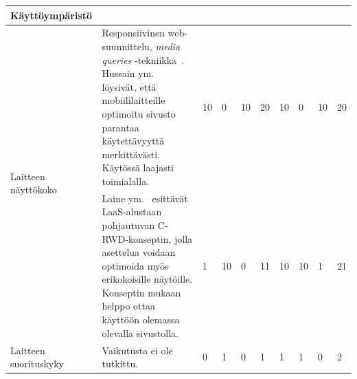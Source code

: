 \documentclass[finnish, 12pt, a4paper, elec, utf8, a-1b, online]{aaltothesis}
\begin{document}
{\begin{longtable}{p{2.5cm}|p{6cm}|p{0.5cm}p{0.5cm}p{0.5cm}|p{0.5cm}|p{0.5cm}p{0.5cm}p{0.5cm}|p{0.5cm}|}
    \midrule
    \textbf{Käyttöympäristö}                                                                                                                                                                                                                                                                                                                                                                                                                                                                                                                                                                                                                                                                                                                              \\
    \midrule
    \multirow[t]{2}{*}{Laitteen näyttökoko} & Responsiivinen web-suunnittelu, \textit{media queries} -tekniikka~\cite{Rivoal:12:MQ}. Hussain ym.~\cite{WOS:000218608600006} löysivät, että mobiililaitteille optimoitu sivusto parantaa käytettävyyttä merkittävästi. Käytössä laajasti toimialalla.                                                                                                                  & 10                                         & 0                                   & 10                                     & 20                           & 10                                              & 0                                         & 10                                        & 20                           \\\cline{2-10}
                                            & Laine ym.~\cite{laine2021responsive} esittävät LaaS-alustaan pohjautuvan C-RWD-konseptin, jolla asettelua voidaan optimoida myös erikokoisille näytöille. Konseptin mukaan helppo ottaa käyttöön olemassa olevalla sivustolla.                                                                                                                                          & 1                                          & 10                                  & 0                                      & 11                           & 10                                              & 10                                        & 1                                         & 21                           \\
    \midrule
    Laitteen suorituskyky                   & Vaikutusta ei ole tutkittu.                                                                                                                                                                                                                                                                                                                                             & 0                                          & 1                                   & 0                                      & 1                            & 1                                               & 1                                         & 0                                         & 2                            \\

\end{longtable}}
\end{document}
